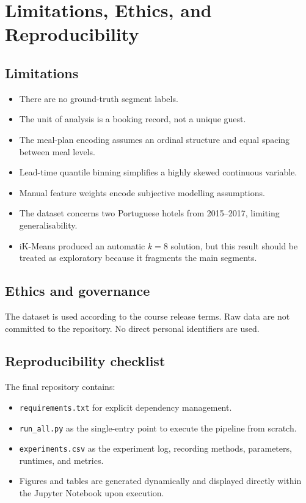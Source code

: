 \documentclass[11pt,a4paper]{article}
\begin{document}
\section{Limitations, Ethics, and Reproducibility}

\subsection{Limitations}
\begin{itemize}
    \item There are no ground-truth segment labels.
    \item The unit of analysis is a booking record, not a unique guest.
    \item The meal-plan encoding assumes an ordinal structure and equal spacing between meal levels.
    \item Lead-time quantile binning simplifies a highly skewed continuous variable.
    \item Manual feature weights encode subjective modelling assumptions.
    \item The dataset concerns two Portuguese hotels from 2015--2017, limiting generalisability.
    \item iK-Means produced an automatic $k=8$ solution, but this result should be treated as exploratory because it fragments the main segments.
\end{itemize}

\subsection{Ethics and governance}
The dataset is used according to the course release terms. Raw data are not committed to the repository. No direct personal identifiers are used.

\subsection{Reproducibility checklist}
The final repository contains:
\begin{itemize}
    \item \texttt{requirements.txt} for explicit dependency management.
    \item \texttt{run\_all.py} as the single-entry point to execute the pipeline from scratch.
    \item \texttt{experiments.csv} as the experiment log, recording methods, parameters, runtimes, and metrics.
    \item Figures and tables are generated dynamically and displayed directly within the Jupyter Notebook upon execution.
\end{itemize}
\end{document}
